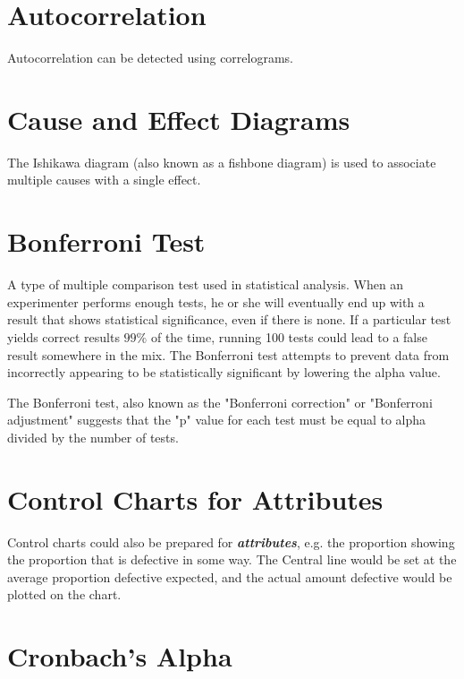 \section{Autocorrelation}

Autocorrelation can be detected using correlograms.
\section{Cause and Effect Diagrams}

The Ishikawa diagram (also known as a fishbone diagram)
is used to associate multiple causes with a single effect.







\section{Bonferroni Test}

A type of multiple comparison test used in statistical analysis. When an experimenter performs enough tests, he or she will eventually end up with a result that shows statistical significance, even if there is none. If a particular test yields correct results $99\%$ of the time, running 100 tests could lead to a false result somewhere in the mix. The Bonferroni test attempts to prevent data from incorrectly appearing to be statistically significant by lowering the alpha value.

The Bonferroni test, also known as the "Bonferroni correction" or "Bonferroni adjustment" suggests that the "p" value for each test must be equal to alpha divided by the number of tests.
\section{Control Charts for Attributes}

Control charts could also be prepared for \emph{\textbf{attributes}}, e.g. the proportion
showing the proportion that is defective in some way.
The Central line would be set at the average proportion defective expected, and
the actual amount defective would be plotted on the chart.
\section{Cronbach's Alpha}


